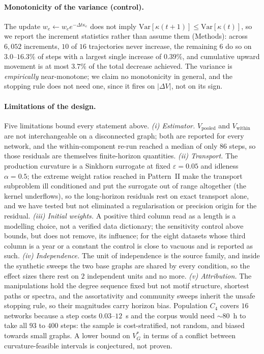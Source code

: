 \documentclass[11pt]{article}
\newcommand{\Var}{\mathrm{Var}}
\begin{document}
\paragraph{Monotonicity of the variance (control).} The update $w_e\leftarrow w_e e^{-\Delta t\kappa_e}$ does not imply
$\Var[\kappa(t+1)]\le\Var[\kappa(t)]$, so we report the increment statistics
rather than assume them (Methods): across $6{,}052$ increments, $10$ of $16$
trajectories never increase, the remaining $6$ do so on $3.0$--$16.3\%$ of steps
with a largest single increase of $0.39\%$, and cumulative upward movement is
at most $3.7\%$ of the total decrease achieved. The variance is
\emph{empirically} near-monotone; we claim no monotonicity in general, and the
stopping rule does not need one, since it fires on $|\Delta V|$, not on its sign.

\paragraph{Limitations of the design.} Five limitations bound every
statement above. \emph{(i) Estimator.} $V_{\mathrm{pooled}}$ and
$V_{\mathrm{within}}$ are not interchangeable on a disconnected graph; both are
reported for every network, and the within-component re-run reached a median of
only $86$ steps, so those residuals are themselves finite-horizon quantities.
\emph{(ii) Transport.} The production curvature is a {Sinkhorn} surrogate at
fixed $\varepsilon=0.05$ and idleness $\alpha=0.5$; the extreme weight ratios
reached in Pattern~II make the transport subproblem ill conditioned and put the
surrogate out of range altogether (the kernel underflows), so the long-horizon
residuals rest on exact transport alone, and we have tested but not eliminated
a regularisation or precision origin for the residual. \emph{(iii) Initial
weights.} A positive third column read as a length is a modelling choice, not a
verified data dictionary; the sensitivity control above bounds, but does not
remove, its influence; for the eight datasets whose third column is a year or a
constant the control is close to vacuous and is reported as such. \emph{(iv)
Independence.} The unit of independence is the source family, and inside the
synthetic sweeps the two base graphs are shared by every condition, so the
effect sizes there rest on $2$ independent units and no more. \emph{(v) Attribution.} The
manipulations hold the degree sequence fixed but not motif structure, shortest
paths or spectra, and the assortativity and community sweeps inherit the unsafe
stopping rule, so their magnitudes carry horizon bias. Population $C_4$ covers
$16$ networks because a step costs $0.03$--$12$~s and the corpus would need
$\sim80$~h to take all $93$ to $400$ steps: the sample is cost-stratified, not
random, and biased towards small graphs. A lower bound on $V_G^*$ in terms of a
conflict between curvature-feasible intervals is conjectured, not proven.
\end{document}
